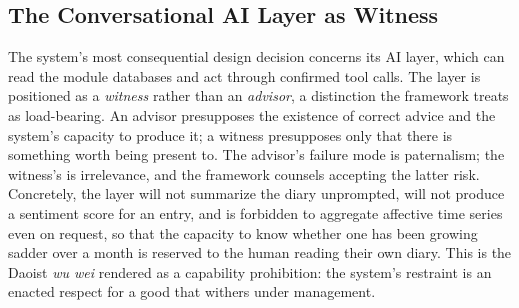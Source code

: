 \subsection{The Conversational AI Layer as Witness}\label{p01:sec:witness}

The system's most consequential design decision concerns its AI layer, which can read the module databases and act through confirmed tool calls. The layer is positioned as a \emph{witness} rather than an \emph{advisor}, a distinction the framework treats as load-bearing. An advisor presupposes the existence of correct advice and the system's capacity to produce it; a witness presupposes only that there is something worth being present to. The advisor's failure mode is paternalism; the witness's is irrelevance, and the framework counsels accepting the latter risk. Concretely, the layer will not summarize the diary unprompted, will not produce a sentiment score for an entry, and is forbidden to aggregate affective time series even on request, so that the capacity to know whether one has been growing sadder over a month is reserved to the human reading their own diary. This is the Daoist \emph{wu wei} rendered as a capability prohibition: the system's restraint is an enacted respect for a good that withers under management.

